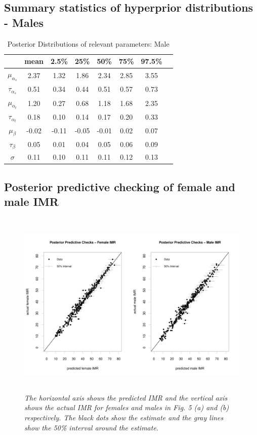 \documentclass{article}
\begin{document}
\subsection{Summary statistics of hyperprior distributions - Males}
\begin{table} [H]
\caption{Posterior Distributions of relevant parameters: Male}
\vspace{2mm}
\def\arraystretch{1}
\centering \begin{tabular}{c c c c c c c c} 
\hline\hline 
\vspace{1mm}
 & mean  & 2.5\%  &  25\% &   50\% &   75\% & 97.5\% &  \\  [0.5ex] \hline
$\mu_{\alpha_s}$ & 2.37 &  1.32 &  1.86  & 2.34 &  2.85 &  3.55  \\
$\tau_{\alpha_s}$  &  0.51  & 0.34 &  0.44  & 0.51  & 0.57 &  0.73    \\
$\mu_{\alpha_t}$ & 1.20  &  0.27 &   0.68  & 1.18  & 1.68 &  2.35        \\
$\tau_{\alpha_t}$ &  0.18  &  0.10  & 0.14  & 0.17  & 0.20  & 0.33  \\
$\mu_{\beta}$ &   -0.02   & -0.11 & -0.05 & -0.01 &  0.02  & 0.07   \\
$\tau_{\beta}$ &  0.05  &   0.01  & 0.04  & 0.05 &  0.06 &  0.09 \\
$\sigma$ & 0.11 & 0.10 &  0.11 &  0.11  & 0.12 &  0.13 \\
\hline 
\end{tabular}
\end{table}


\subsection{Posterior predictive checking of female and male IMR}
\begin{figure}[H]
   \begin{center}
   \includegraphics[height = 9cm, width = 15cm]{ppc_1.pdf}
   \end{center}
   \caption{\emph{The horizontal axis shows the predicted IMR and the vertical axis shows the actual IMR for females and males in Fig. 5 (a) and (b) respectively. The black dots show the estimate and the gray lines show the 50\% interval around the estimate.}}
\end{figure}
\end{document}
